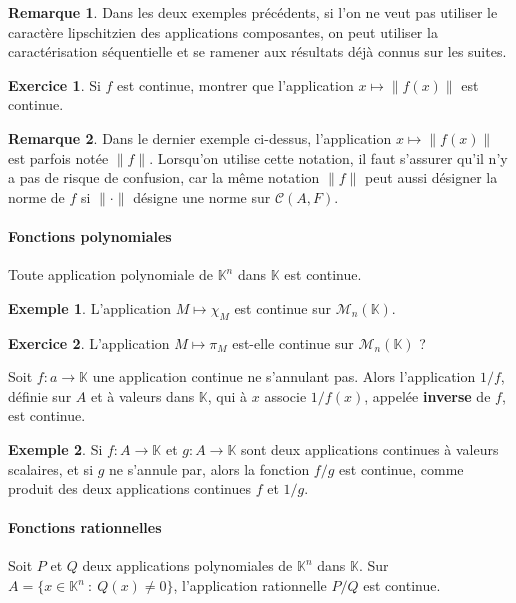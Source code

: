 \documentclass[french]{article}
\newcommand{\K}{\mathbb{K}}
\theoremstyle{plain}
\theoremstyle{definition}
\newtheorem*{ex}{Exemple}
\newtheorem{exo}{Exercice}
\newtheorem*{rmq}{Remarque}
\theoremstyle{remark}
\begin{document}
\begin{rmq}
	Dans les deux exemples précédents, si l'on ne veut pas utiliser le caractère lipschitzien des applications composantes, on peut utiliser la caractérisation séquentielle et se ramener aux résultats déjà connus sur les suites.
\end{rmq}

\begin{exo}
	Si $f$ est continue, montrer que l'application $x\mapsto \lVert f(x)\rVert$ est continue.
\end{exo}

\begin{rmq}
	Dans le dernier exemple ci-dessus, l'application $x\mapsto\lVert f(x)\rVert$ est parfois notée $\lVert f\rVert$. Lorsqu'on utilise cette notation, il faut s'assurer qu'il n'y a pas de risque de confusion, car la même notation $\lVert f\rVert$ peut aussi désigner la norme de $f$ si $\lVert\cdot\rVert$ désigne une norme sur $\mathcal{C}(A,F)$.
\end{rmq}

\paragraph{Fonctions polynomiales} Toute application polynomiale de $\K^n$ dans $\K$ est continue.

\begin{ex}
	L'application $M\mapsto \chi_M$ est continue sur $\mathcal{M}_n(\K)$. %
\end{ex}

\begin{exo}
	L'application $M\mapsto\pi_M$ est-elle continue sur $\mathcal{M}_n(\K)$ ?
\end{exo}

\begin{thm}{}%
	Soit $f:a\to\K$ une application continue ne s'annulant pas. Alors l'application $1/f$, définie sur $A$ et à valeurs dans $\K$, qui à $x$ associe $1/f(x)$, appelée \textbf{inverse} de $f$, est continue.
\end{thm}

\begin{ex}
	Si $f:A\to\K$ et $g:A\to\K$ sont deux applications continues à valeurs scalaires, et si $g$ ne s'annule par, alors la fonction $f/g$ est continue, comme produit des deux applications continues $f$ et $1/g$.
\end{ex}

\paragraph{Fonctions rationnelles} Soit $P$ et $Q$ deux applications polynomiales de $\K^n$ dans $\K$. Sur $A=\{x\in\K^n\ :\ Q(x)\ne 0\}$, l'application rationnelle $P/Q$ est continue.
\end{document}
